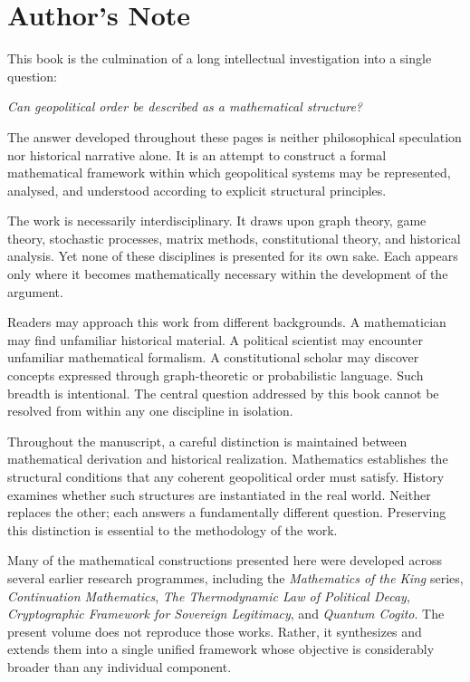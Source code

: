 \documentclass[11pt,openany]{book}
\theoremstyle{plain}
\theoremstyle{definition}
\begin{document}
\chapter*{Author's Note}

This book is the culmination of a long intellectual investigation into a single question:

\begin{center}
\emph{Can geopolitical order be described as a mathematical structure?}
\end{center}

The answer developed throughout these pages is neither philosophical speculation nor historical narrative alone. It is an attempt to construct a formal mathematical framework within which geopolitical systems may be represented, analysed, and understood according to explicit structural principles.

The work is necessarily interdisciplinary. It draws upon graph theory, game theory, stochastic processes, matrix methods, constitutional theory, and historical analysis. Yet none of these disciplines is presented for its own sake. Each appears only where it becomes mathematically necessary within the development of the argument.

Readers may approach this work from different backgrounds. A mathematician may find unfamiliar historical material. A political scientist may encounter unfamiliar mathematical formalism. A constitutional scholar may discover concepts expressed through graph-theoretic or probabilistic language. Such breadth is intentional. The central question addressed by this book cannot be resolved from within any one discipline in isolation.

Throughout the manuscript, a careful distinction is maintained between mathematical derivation and historical realization. Mathematics establishes the structural conditions that any coherent geopolitical order must satisfy. History examines whether such structures are instantiated in the real world. Neither replaces the other; each answers a fundamentally different question. Preserving this distinction is essential to the methodology of the work.

Many of the mathematical constructions presented here were developed across several earlier research programmes, including the \emph{Mathematics of the King} series, \emph{Continuation Mathematics}, \emph{The Thermodynamic Law of Political Decay}, \emph{Cryptographic Framework for Sovereign Legitimacy}, and \emph{Quantum Cogito}. The present volume does not reproduce those works. Rather, it synthesizes and extends them into a single unified framework whose objective is considerably broader than any individual component.
\end{document}
